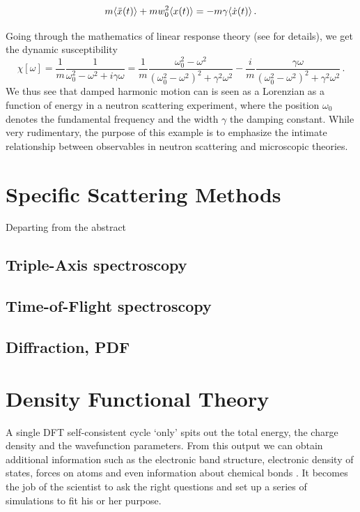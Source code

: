 \[ m \langle \ddot{x}(t) \rangle + m w_0^2 \langle x(t) \rangle = - m\gamma\langle \dot{x}(t) \rangle \, . \]

\noindent Going through the mathematics of linear response theory (see \cite{Lovesey1984} for details), we get the dynamic susceptibility
%
\[ \chi[\omega] = \frac{1}{m}\frac{1}{\omega_0^2 - \omega^2 + i\gamma\omega} = \frac{1}{m} \frac{\omega_0^2 - \omega^2}{(\omega_0^2-\omega^2)^2 + \gamma^2\omega^2} - \frac{i}{m}\frac{\gamma\omega}{(\omega_0^2-\omega^2)^2 + \gamma^2\omega^2} \, . \]
%
We thus see that damped harmonic motion can is seen as a Lorenzian as a function of energy in a neutron scattering experiment, where the position $\omega_0$ denotes the fundamental frequency and the width $\gamma$ the damping constant. While very rudimentary, the purpose of this example is to emphasize the intimate relationship between observables in neutron scattering and microscopic theories.

\section{Specific Scattering Methods}
Departing from the abstract

\subsection{Triple-Axis spectroscopy}

\subsection{Time-of-Flight spectroscopy}

\subsection{Diffraction, PDF}

\section{Density Functional Theory}\label{sec:dft}

A single DFT self-consistent cycle `only' spits out the total energy, the charge density and the wavefunction parameters. From this output we can obtain additional information such as the electronic band structure, electronic density of states, forces on atoms and even information about chemical bonds \cite{Silvi1994}. It becomes the job of the scientist to ask the right questions and set up a series of simulations to fit his or her purpose.

